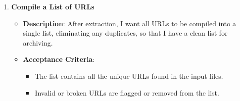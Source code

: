 \begin{enumerate}
    \item \textbf{Compile a List of URLs}
    \begin{itemize}
        \item \textbf{Description}: After extraction, I want all URLs to be compiled into a single list, eliminating any duplicates, so that I have a clean list for archiving.
        \item \textbf{Acceptance Criteria}:
        \begin{itemize}
            \item The list contains all the unique URLs found in the input files.
            \item Invalid or broken URLs are flagged or removed from the list.
        \end{itemize}
    \end{itemize}
\end{enumerate}